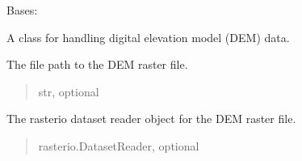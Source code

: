 \documentclass[letterpaper,10pt,english]{sphinxmanual}
\begin{document}
\begin{fulllineitems}
\label{\detokenize{pysewer:pysewer.preprocessing.DEM}}
\pysigstartsignatures
{}
\pysigstopsignatures
\sphinxAtStartPar
Bases: 

\sphinxAtStartPar
A class for handling digital elevation model (DEM) data.

\begin{fulllineitems}
\label{\detokenize{pysewer:pysewer.preprocessing.DEM.file_path}}
\pysigstartsignatures
{}
\pysigstopsignatures
\sphinxAtStartPar
The file path to the DEM raster file.
\begin{quote}\begin{description}
\sphinxAtStartPar
str, optional

\end{description}\end{quote}

\end{fulllineitems}


\begin{fulllineitems}
\label{\detokenize{pysewer:pysewer.preprocessing.DEM.raster}}
\pysigstartsignatures
{}
\pysigstopsignatures
\sphinxAtStartPar
The rasterio dataset reader object for the DEM raster file.
\begin{quote}\begin{description}
\sphinxAtStartPar
rasterio.DatasetReader, optional

\end{description}\end{quote}

\end{fulllineitems}



\end{fulllineitems}
\end{document}
